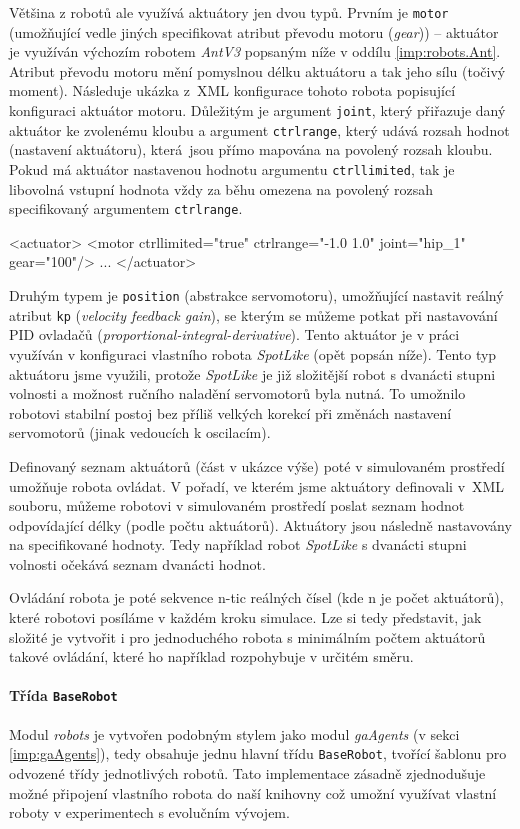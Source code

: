 Většina z robotů ale využívá aktuátory jen dvou typů. Prvním je \texttt{motor}
(umožňující vedle jiných specifikovat atribut převodu motoru (\emph{gear})) --
aktuátor je využíván výchozím robotem \emph{AntV3} popsaným níže v oddílu
\ref{imp:robots.Ant}. Atribut převodu motoru mění pomyslnou délku aktuátoru a
tak jeho sílu (točivý moment). Následuje ukázka z~XML konfigurace tohoto robota
popisující konfiguraci aktuátor motoru. Důležitým je argument \texttt{joint},
který přiřazuje daný aktuátor ke zvolenému kloubu a argument
\texttt{ctrlrange}, který udává rozsah hodnot (nastavení aktuátoru), která~jsou
přímo mapována na povolený rozsah kloubu. Pokud má aktuátor nastavenou hodnotu
argumentu \texttt{ctrllimited}, tak je libovolná vstupní hodnota vždy za běhu
omezena na povolený rozsah specifikovaný argumentem \texttt{ctrlrange}.
\begin{code}
<actuator>
  <motor ctrllimited="true" ctrlrange="-1.0 1.0" joint="hip_1"   
   gear="100"/>
  ...
</actuator>
\end{code}
Druhým typem je \texttt{position} (abstrakce servomotoru), umožňující nastavit
reálný atribut \texttt{kp} (\emph{velocity feedback gain}), se kterým se můžeme
potkat při nastavování PID ovladačů (\emph{proportional-integral-derivative}).
Tento aktuátor je v práci využíván v konfiguraci vlastního robota
\emph{SpotLike} (opět popsán níže). Tento typ aktuátoru jsme využili,
protože \emph{SpotLike} je již složitější robot s dvanácti stupni volnosti a
možnost ručního naladění servomotorů byla nutná. To umožnilo robotovi stabilní
postoj bez příliš velkých korekcí při změnách nastavení servomotorů (jinak
vedoucích k oscilacím).

Definovaný seznam aktuátorů (část v ukázce výše) poté v simulovaném prostředí
umožňuje robota ovládat. V pořadí, ve kterém jsme aktuátory definovali v~XML
souboru, můžeme robotovi v simulovaném prostředí poslat seznam hodnot
odpovídající délky (podle počtu aktuátorů). Aktuátory jsou následně nastavovány
na specifikované hodnoty. Tedy například robot \emph{SpotLike} s dvanácti
stupni volnosti očekává seznam dvanácti hodnot.

Ovládání robota je poté sekvence n-tic reálných čísel (kde n je počet
aktuátorů), které robotovi posíláme v každém kroku simulace. Lze si tedy
představit, jak složité je vytvořit i pro jednoduchého robota s minimálním
počtem aktuátorů takové ovládání, které ho například rozpohybuje v určitém
směru.

\paragraph{Třída \texttt{BaseRobot}}
Modul \emph{robots} je vytvořen podobným stylem jako modul \emph{gaAgents} (v sekci
\ref{imp:gaAgents}), tedy obsahuje jednu hlavní třídu \texttt{BaseRobot},
tvořící šablonu pro odvozené třídy jednotlivých robotů. Tato implementace
zásadně zjednodušuje možné připojení vlastního robota do naší knihovny což
umožní využívat vlastní roboty v experimentech s evolučním vývojem. 

